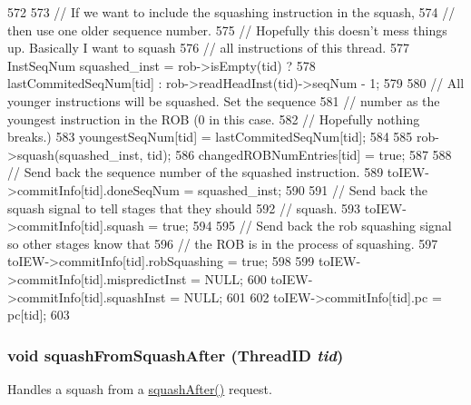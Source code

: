 \begin{DoxyCode}
572 {
573     // If we want to include the squashing instruction in the squash,
574     // then use one older sequence number.
575     // Hopefully this doesn't mess things up.  Basically I want to squash
576     // all instructions of this thread.
577     InstSeqNum squashed_inst = rob->isEmpty(tid) ?
578         lastCommitedSeqNum[tid] : rob->readHeadInst(tid)->seqNum - 1;
579 
580     // All younger instructions will be squashed. Set the sequence
581     // number as the youngest instruction in the ROB (0 in this case.
582     // Hopefully nothing breaks.)
583     youngestSeqNum[tid] = lastCommitedSeqNum[tid];
584 
585     rob->squash(squashed_inst, tid);
586     changedROBNumEntries[tid] = true;
587 
588     // Send back the sequence number of the squashed instruction.
589     toIEW->commitInfo[tid].doneSeqNum = squashed_inst;
590 
591     // Send back the squash signal to tell stages that they should
592     // squash.
593     toIEW->commitInfo[tid].squash = true;
594 
595     // Send back the rob squashing signal so other stages know that
596     // the ROB is in the process of squashing.
597     toIEW->commitInfo[tid].robSquashing = true;
598 
599     toIEW->commitInfo[tid].mispredictInst = NULL;
600     toIEW->commitInfo[tid].squashInst = NULL;
601 
602     toIEW->commitInfo[tid].pc = pc[tid];
603 }
\end{DoxyCode}
\hypertarget{classDefaultCommit_a05dbc60b1e537c4a85f4ab6dec6ca9a4}{
\subsubsection[{squashFromSquashAfter}]{\setlength{\rightskip}{0pt plus 5cm}void squashFromSquashAfter ({\bf ThreadID} {\em tid})}}
\label{classDefaultCommit_a05dbc60b1e537c4a85f4ab6dec6ca9a4}
Handles a squash from a \hyperlink{classDefaultCommit_ad47b387a7bbc4a2153b50f96b8fd2a51}{squashAfter()} request. 



